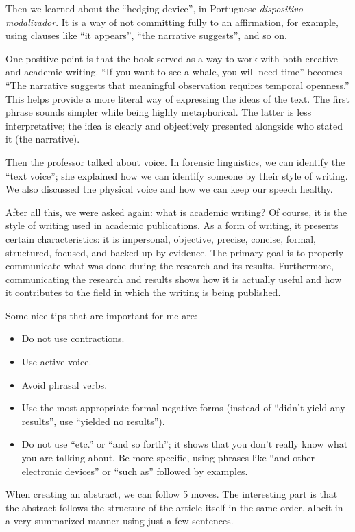 Then we learned about the ``hedging device'', in Portuguese \textit{dispositivo modalizador}. It is a way of not committing fully to an affirmation, for example, using clauses like ``it appears'', ``the narrative suggests'', and so on.

One positive point is that the book served as a way to work with both creative and academic writing. ``If you want to see a whale, you will need time'' becomes ``The narrative suggests that meaningful observation requires temporal openness.'' This helps provide a more literal way of expressing the ideas of the text. The first phrase sounds simpler while being highly metaphorical. The latter is less interpretative; the idea is clearly and objectively presented alongside who stated it (the narrative).

Then the professor talked about voice. In forensic linguistics, we can identify the ``text voice''; she explained how we can identify someone by their style of writing. We also discussed the physical voice and how we can keep our speech healthy.

After all this, we were asked again: what is academic writing? Of course, it is the style of writing used in academic publications. As a form of writing, it presents certain characteristics: it is impersonal, objective, precise, concise, formal, structured, focused, and backed up by evidence. The primary goal is to properly communicate what was done during the research and its results. Furthermore, communicating the research and results shows how it is actually useful and how it contributes to the field in which the writing is being published.

Some nice tips that are important for me are:
\begin{itemize}
    \item Do not use contractions.
    \item Use active voice.
    \item Avoid phrasal verbs.
    \item Use the most appropriate formal negative forms (instead of ``didn't yield any results'', use ``yielded no results'').
    \item Do not use ``etc.'' or ``and so forth''; it shows that you don't really know what you are talking about. Be more specific, using phrases like ``and other electronic devices'' or ``such as'' followed by examples.
\end{itemize}

When creating an abstract, we can follow 5 moves. The interesting part is that the abstract follows the structure of the article itself in the same order, albeit in a very summarized manner using just a few sentences.
